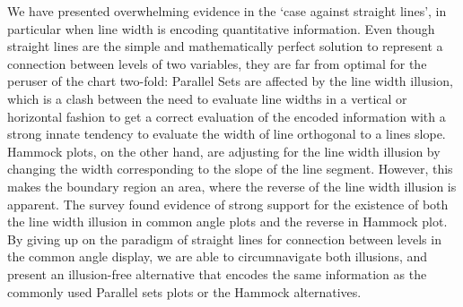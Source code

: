 We have presented overwhelming evidence in the `case against straight lines', in particular when line width is encoding quantitative information. Even though straight lines are the simple and mathematically perfect solution to represent a connection  between levels of two variables, they are far from optimal for the peruser of the chart two-fold:   Parallel Sets are affected by the line width illusion, which is a clash between the need to evaluate line widths in a vertical or horizontal fashion to get a correct evaluation of the encoded information with a strong innate tendency to evaluate the width of line orthogonal to a lines slope. Hammock plots, on the other hand, are adjusting for the line width illusion by changing the  width corresponding to the slope of the line segment. However, this makes the boundary region an area, where the reverse of the line width illusion is apparent. The survey found evidence of strong support for the existence of both the line width illusion in common angle plots and the reverse in Hammock plot. By giving up on the paradigm of straight lines for connection between levels in the common angle display, we are able to circumnavigate both illusions, and present an illusion-free alternative that encodes the same information as the commonly used Parallel sets plots or the Hammock alternatives.



%
\appendix
%


